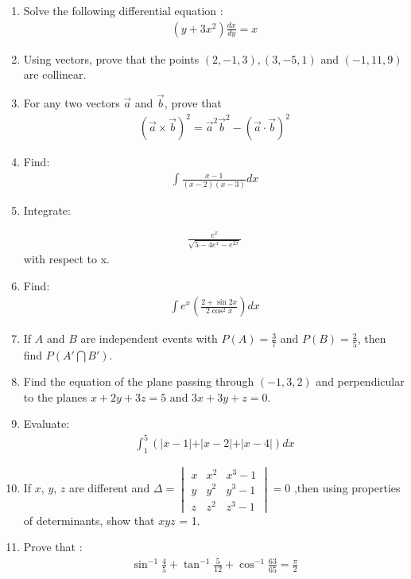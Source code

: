 \documentclass[10pt,-letter paper]{article}
\providecommand{\brak}[1]{\ensuremath{\left(#1\right)}}
\newcommand{\mydet}[1]{\ensuremath{\begin{vmatrix}#1\end{vmatrix}}}
\begin{document}
\begin{enumerate}
\item Solve the following differential equation :
\begin{align*}          
	 \brak{y + 3x^{2}}\frac{dx}{dy}=x
\end{align*}

\item Using vectors, prove that the points $\brak{2,-1,3},\brak{3,-5,1}$ and 
	$\brak{-1,11,9}$ are collinear.

\item For any two vectors $\overrightarrow{a}$ and $\overrightarrow{b}$, prove that 
\begin{align*}
\brak{{\overrightarrow{a} \times \overrightarrow{b}}}^2 = \overrightarrow{a}^2  \overrightarrow{b}^2 - \brak{{\overrightarrow{a} \cdot \overrightarrow{b}}}^2
\end{align*}
\item Find:\begin{align*}
		\int\frac{x-1}{\brak{x-2}\brak{x-3}}dx
\end{align*}
\item Integrate:

	\begin{align*}
		\frac{e^x}{\sqrt{5-4e^x-e^{2x}}}
	\end{align*}
		     with respect to x.

\item Find:
	\begin{align*}
		\int {e^x\brak{\frac{2+\sin 2x}{2 \cos^2 x}}} dx
	\end{align*}

\item If $A$ and $B$ are independent events with $P\brak{A}=\frac{3}{7}$ and $P\brak{B}=\frac{2}{5}$, then find $P\brak{A'\bigcap B'}$.

\item Find the equation of the plane passing through $\brak{-1,3,2}$ and perpendicular to the planes $x+2y+3z=5$ and $3x+3y+z=0$.

\item Evaluate: 
	\begin{align*}
		\int_{1}^{5} \brak{\vert{x-1}\vert+\vert{x-2}\vert+\vert{x-4}\vert} dx
	\end{align*}

\item If $x$, $y$, $z$ are different and $\Delta=\mydet{x & x^2 & x^3 -1\\y & y^2 & y^3 -1\\z & z^2 & z^3 -1} = 0$ ,then using properties of determinants, show that $xyz$ = 1.
\item Prove that : 
	\begin{align*}
		\sin^{-1}\frac{4}{5}+\tan^{-1}\frac{5}{12}+\cos^{-1}\frac{63}{65}=\frac{\pi}{2}
	\end{align*}


\end{enumerate}
\end{document}
